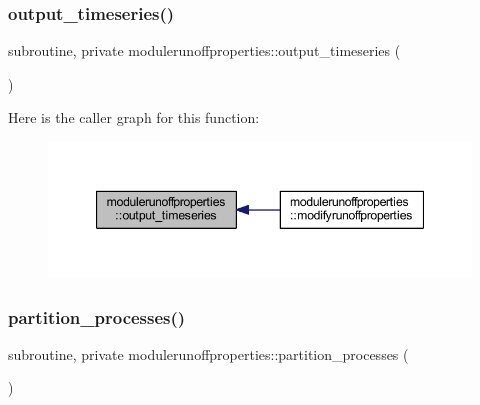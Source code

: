 \subsubsection{\texorpdfstring{output\+\_\+timeseries()}{output\_timeseries()}}
{\footnotesize\ttfamily subroutine, private modulerunoffproperties\+::output\+\_\+timeseries (\begin{DoxyParamCaption}{ }\end{DoxyParamCaption})\hspace{0.3cm}{\ttfamily [private]}}

Here is the caller graph for this function\+:\nopagebreak
\begin{figure}[H]
\begin{center}
\leavevmode
\includegraphics[width=347pt]{namespacemodulerunoffproperties_aab6832deb9eca45c9392ee3c49085c37_icgraph}
\end{center}
\end{figure}
\mbox{\label{namespacemodulerunoffproperties_a6a27cac0933a3a6597bcb4971c40e53b}} 
\subsubsection{\texorpdfstring{partition\+\_\+processes()}{partition\_processes()}}
{\footnotesize\ttfamily subroutine, private modulerunoffproperties\+::partition\+\_\+processes (\begin{DoxyParamCaption}{ }\end{DoxyParamCaption})\hspace{0.3cm}{\ttfamily [private]}}

